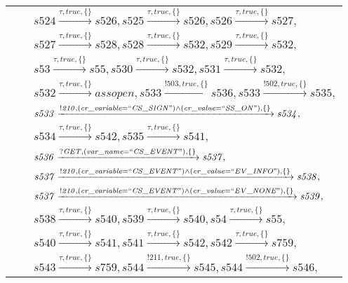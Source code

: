 \begin{tabular}{lcp{350px}}
& & $\mathit{s524}\xrightarrow{\mathit{\tau}, \mathit{true}, \{\}}\mathit{s526},\mathit{s525}\xrightarrow{\mathit{\tau}, \mathit{true}, \{\}}\mathit{s526},\mathit{s526}\xrightarrow{\mathit{\tau}, \mathit{true}, \{\}}\mathit{s527},$ \\
& & $\mathit{s527}\xrightarrow{\mathit{\tau}, \mathit{true}, \{\}}\mathit{s528},\mathit{s528}\xrightarrow{\mathit{\tau}, \mathit{true}, \{\}}\mathit{s532},\mathit{s529}\xrightarrow{\mathit{\tau}, \mathit{true}, \{\}}\mathit{s532},$ \\
& & $\mathit{s53}\xrightarrow{\mathit{\tau}, \mathit{true}, \{\}}\mathit{s55},\mathit{s530}\xrightarrow{\mathit{\tau}, \mathit{true}, \{\}}\mathit{s532},\mathit{s531}\xrightarrow{\mathit{\tau}, \mathit{true}, \{\}}\mathit{s532},$ \\
& & $\mathit{s532}\xrightarrow{\mathit{\tau}, \mathit{true}, \{\}}\mathit{assopen},\mathit{s533}\xrightarrow{\mathit{!503}, \mathit{true}, \{\}}\mathit{s536},\mathit{s533}\xrightarrow{\mathit{!502}, \mathit{true}, \{\}}\mathit{s535},$ \\
& & $\mathit{s533}\xrightarrow{\mathit{!210}, \mathit{(cr\_variable = ``CS\_SIGN") \land (cr\_value = ``SS\_ON")}, \{\}}\mathit{s534},$ \\
& & $\mathit{s534}\xrightarrow{\mathit{\tau}, \mathit{true}, \{\}}\mathit{s542},\mathit{s535}\xrightarrow{\mathit{\tau}, \mathit{true}, \{\}}\mathit{s541},$ \\
& & $\mathit{s536}\xrightarrow{\mathit{?GET}, \mathit{(var\_name = ``CS\_EVENT")}, \{\}}\mathit{s537},$ \\
& & $\mathit{s537}\xrightarrow{\mathit{!210}, \mathit{(cr\_variable = ``CS\_EVENT") \land (cr\_value = ``EV\_INFO")}, \{\}}\mathit{s538},$ \\
& & $\mathit{s537}\xrightarrow{\mathit{!210}, \mathit{(cr\_variable = ``CS\_EVENT") \land (cr\_value = ``EV\_NONE")}, \{\}}\mathit{s539},$ \\
& & $\mathit{s538}\xrightarrow{\mathit{\tau}, \mathit{true}, \{\}}\mathit{s540},\mathit{s539}\xrightarrow{\mathit{\tau}, \mathit{true}, \{\}}\mathit{s540},\mathit{s54}\xrightarrow{\mathit{\tau}, \mathit{true}, \{\}}\mathit{s55},$ \\
& & $\mathit{s540}\xrightarrow{\mathit{\tau}, \mathit{true}, \{\}}\mathit{s541},\mathit{s541}\xrightarrow{\mathit{\tau}, \mathit{true}, \{\}}\mathit{s542},\mathit{s542}\xrightarrow{\mathit{\tau}, \mathit{true}, \{\}}\mathit{s759},$ \\
& & $\mathit{s543}\xrightarrow{\mathit{\tau}, \mathit{true}, \{\}}\mathit{s759},\mathit{s544}\xrightarrow{\mathit{!211}, \mathit{true}, \{\}}\mathit{s545},\mathit{s544}\xrightarrow{\mathit{!502}, \mathit{true}, \{\}}\mathit{s546},$ \\

\end{tabular}
